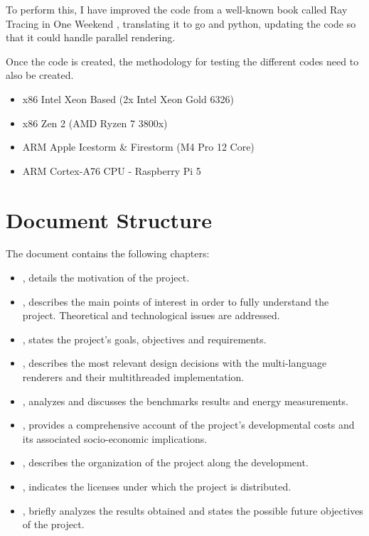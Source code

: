 To perform this, I have improved the code from a well-known book called Ray Tracing in One Weekend
\cite{Shirley2016RTW1}, translating it to go and python, updating the code so that it could handle parallel rendering. 

Once the code is created, the methodology for testing the different codes need to also be created. \begin{itemize}
    \item x86 Intel Xeon Based (2x Intel Xeon Gold 6326)
    \item x86 Zen 2 (AMD Ryzen 7 3800x)
    \item ARM Apple Icestorm \& Firestorm (M4 Pro 12 Core)
    \item ARM Cortex-A76 CPU - Raspberry Pi 5
\end{itemize} 

\section{Document Structure}\label{sec:structure}
The document contains the following chapters:
\begin{itemize}
  \item {}, details the motivation of the project.
  \item {}, describes the main points of interest in order to fully understand the project. Theoretical and technological issues are addressed.
  \item {}, states the project's goals, objectives and requirements.
  \item {}, describes the most relevant design decisions with the multi-language renderers and their multithreaded implementation.
  \item {}, analyzes and discusses the benchmarks results and energy measurements.
  \item {}, provides a comprehensive account of the project's developmental costs and its associated socio-economic implications.
  \item {}, describes the organization of the project along the development.
  \item {}, indicates the licenses under which the project is distributed.
  \item {}, briefly analyzes the results obtained and states the possible future objectives of the project.
\end{itemize}
